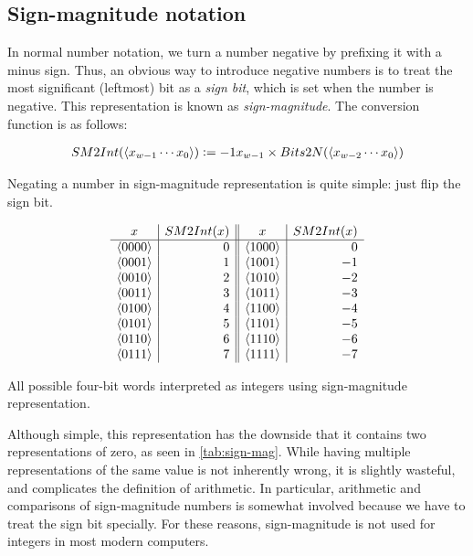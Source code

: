 \subsection{Sign-magnitude notation}
\label{sec:sign-magnitude}

In normal number notation, we turn a number negative by prefixing it
with a minus sign.  Thus, an obvious way to introduce negative numbers
is to treat the most significant (leftmost) bit as a \emph{sign bit},
which is set when the number is negative.  This representation is
known as \emph{sign-magnitude}.  The conversion function is as
follows:

\begin{definition}
\begin{align*}
    SM2Int(\langle x_{w-1}\cdots x_{0} \rangle) \vcentcolon= -1x_{w-1} \times Bits2N(\langle x_{w-2}\cdots x_{0} \rangle)
\end{align*}
\label{def:sm2int}
\end{definition}

Negating a number in sign-magnitude representation is quite simple:
just flip the sign bit.

\begin{table}
  \centering
  \[
  \begin{array}{c|r||c|r}
    x & SM2Int(x) & x & SM2Int(x) \\\hline
    \langle 0000 \rangle & 0 & \langle 1000 \rangle & 0 \\
    \langle 0001 \rangle & 1 & \langle 1001 \rangle & -1 \\
    \langle 0010 \rangle & 2 & \langle 1010 \rangle & -2 \\
    \langle 0011 \rangle & 3 & \langle 1011 \rangle & -3 \\
    \langle 0100 \rangle & 4 & \langle 1100 \rangle & -4 \\
    \langle 0101 \rangle & 5 & \langle 1101 \rangle & -5 \\
    \langle 0110 \rangle & 6 & \langle 1110 \rangle & -6 \\
    \langle 0111 \rangle & 7 & \langle 1111 \rangle & -7 \\
  \end{array}
  \]
  \caption{All possible four-bit words interpreted as integers using
    sign-magnitude representation.}
  \label{tab:sign-mag}
\end{table}

Although simple, this representation has the downside that it contains
two representations of zero, as seen in \cref{tab:sign-mag}.  While
having multiple representations of the same value is not inherently
wrong, it is slightly wasteful, and complicates the definition of
arithmetic.  In particular, arithmetic and comparisons of
sign-magnitude numbers is somewhat involved because we have to treat
the sign bit specially.  For these reasons, sign-magnitude is not used
for integers in most modern computers.

